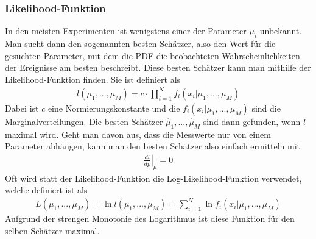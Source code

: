 \subsubsection{Likelihood-Funktion}
In den meisten Experimenten ist wenigstens einer der Parameter $\mu_{i}$ unbekannt.
Man sucht dann den sogenannten \glqq besten Schätzer\grqq{}, also den Wert für die gesuchten Parameter, mit dem die PDF die beobachteten Wahrscheinlichkeiten der Ereignisse am besten beschreibt.
Diese besten Schätzer kann man mithilfe der Likelihood-Funktion finden.
Sie ist definiert als
\begin{gather}
	l(\mu_{1},...,\mu_{M}) = c \cdot \prod_{i=1}^{N} f_{i}(x_{i}|\mu_{1},...,\mu_{M})
\end{gather}
Dabei ist $c$ eine Normierungskonstante und die $f_{i}(x_{i}|\mu_{1},...,\mu_{M})$ sind die Marginalverteilungen.
Die besten Schätzer $\hat{\mu}_{1},...,\hat{\mu}_{M}$ sind dann gefunden, wenn $l$ maximal wird.
Geht man davon aus, dass die Messwerte nur von einem Parameter abhängen, kann man den besten Schätzer also einfach ermitteln mit
\begin{gather}
	\left. \frac{dl}{dp} \right |_{\hat{\mu}} = 0
\end{gather}
Oft wird statt der Likelihood-Funktion die Log-Likelihood-Funktion verwendet, welche definiert ist als
\begin{gather}
	L(\mu_{1},...,\mu_{M}) = \ln{l(\mu_{1},...,\mu_{M})} = \sum_{i=1}^{N} \ln{f_{i}(x_{i}|\mu_{1},...,\mu_{M})}
\end{gather}
Aufgrund der strengen Monotonie des Logarithmus ist diese Funktion für den selben Schätzer maximal.


